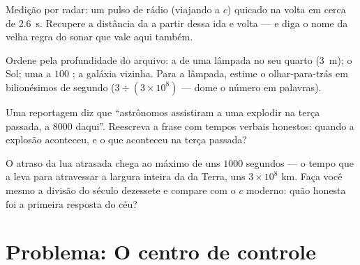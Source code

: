 \begin{exercise}[$\star\star$]\label{exo:g8:speed-of-light:9}
Medição por radar: um pulso de rádio (viajando a $c$) quicado na 
volta em cerca de \qty{2.6}{s}. Recupere a distância da  a partir
dessa ida e volta --- e diga o nome da velha regra do sonar que vale
aqui também.
\end{exercise}

\begin{exercise}[$\star\star$]\label{exo:g8:speed-of-light:10}
Ordene pela profundidade do arquivo: a  de uma lâmpada no seu
quarto (\qty{3}{m}); o Sol; uma  a $100$ ; a galáxia
vizinha. Para a lâmpada, estime o olhar-para-trás em bilionésimos de
segundo ($3 \div (3 \times 10^{8})$ --- dome o número em palavras).
\end{exercise}

\begin{exercise}[$\star\star$]\label{exo:g8:speed-of-light:11}
Uma reportagem diz que ``astrônomos assistiram a uma  explodir
na terça passada, a $8000$  daqui''. Reescreva a frase com
tempos verbais honestos: quando a explosão aconteceu, e o que
aconteceu na terça passada?
\end{exercise}

\begin{exercise}[$\star\star\star$]\label{exo:g8:speed-of-light:12}
O atraso da lua atrasada chega ao máximo de uns $1000$ segundos --- o
tempo que a  leva para atravessar a largura inteira da  da
Terra, uns $3 \times 10^{8}$ km. Faça você mesmo a divisão do século
dezessete e compare com o $c$ moderno: quão honesta foi a primeira
resposta do céu?
\end{exercise}

\section{Problema: O centro de controle}


